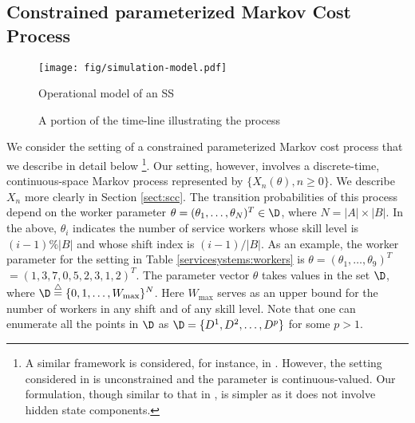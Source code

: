 \documentclass[11pt,letterpaper,english]{article}
\begin{document}
\subsection{Constrained parameterized Markov Cost Process}
\label{sec:constrained-markov}

\begin{figure}
\begin{minipage}[c][\textheight]{\textwidth} 
    \centering
    \texttt{[image: fig/simulation-model.pdf]}
    \caption{Operational model of an SS}
    \label{fig_ss}
\end{minipage}
\end{figure}

\begin{figure}
\begin{minipage}[c][\textheight]{\textwidth} 
\centering
{}
\caption{A portion of the time-line illustrating the process}
\label{fig:timeline}
\end{minipage}
\end{figure}

We consider the setting of a constrained parameterized Markov cost process that we describe
in detail below
\footnote{A similar framework is
considered, for instance, in \citep{marbach2001simulation,prashanth2011ss}. However, the setting
considered in \citep{marbach2001simulation} is unconstrained and the parameter is continuous-valued. Our formulation, though similar to that in \citep{prashanth2011ss}, is simpler as it does not involve hidden state components.}. 
Our setting, however, involves a discrete-time, continuous-space Markov process
represented by $\{X_n(\theta), n \ge0\}$. We describe
$X_n$ more clearly in Section \ref{sect:scc}. The transition
probabilities of this process depend on the worker parameter $\theta  =
(\theta_{1},\ldots,\theta_N)^T \in \D$,
where $N = |A| \times |B|$. In the above, $\theta_{i}$ indicates the number of
service workers whose skill level is $(i-1) \% |B|$ and whose shift index is
$(i-1) / |B|$. As an example, the worker parameter for the setting in Table
\ref{servicesystems:workers} is $\theta = (\theta_1, \ldots, \theta_9)^T$ $=
(1,3,7,0,5,2,3,1,2)^T$.
The parameter vector $\theta$ takes values in the set $\D$, where ${\displaystyle \D
\stackrel{\triangle}{=}
 \{0,1, \ldots, W_{\max}\}^N }$. Here
$W_{\max}$ serves as an upper bound for the number of workers in any shift and of any skill level. Note that one can enumerate all the points in $\D$ as $\D = \{D^1, D^2, \ldots, D^p\}$ for some $p >1$.
\end{document}
